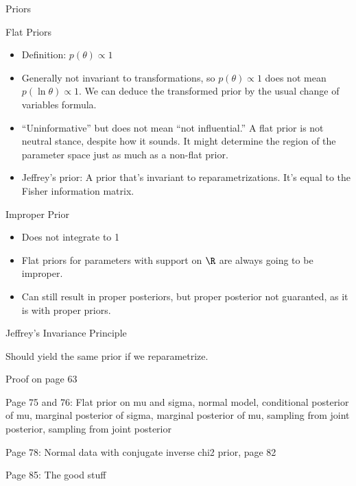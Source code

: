 \documentclass[aspectratio=169, handout]{beamer}
\begin{document}
{\scriptsize
\begin{frame}{Priors}

Flat Priors
\begin{itemize}
  \item Definition: $p(\theta)\propto 1$
  \item Generally not invariant to transformations, so
    $p(\theta)\propto 1$ does not mean $p(\ln \theta)\propto 1$.
    We can deduce the transformed prior by the usual change of variables
    formula.
  \item
    ``Uninformative'' but does not mean ``not influential.''
    A flat prior is not neutral stance, despite how it sounds.
    It might determine the region of the parameter space just as much as
    a non-flat prior.

  \item
    \alert{Jeffrey's prior}:
    A prior that's invariant to reparametrizations.
    It's equal to the Fisher information matrix.
\end{itemize}
\alert{Improper Prior}
\begin{itemize}
  \item Does not integrate to 1
  \item Flat priors for parameters with support on $\R$ are always going
    to be improper.
  \item Can still result in proper posteriors, but proper posterior not
    guaranted, as it is with proper priors.
\end{itemize}
\end{frame}
}



{\footnotesize
\begin{frame}{Jeffrey's Invariance Principle}

Should yield the same prior if we reparametrize.

Proof on page 63

Page 75 and 76: Flat prior on mu and sigma, normal model, conditional
posterior of mu, marginal posterior of sigma, marginal posterior of mu,
sampling from joint posterior, sampling from joint posterior

Page 78: Normal data with conjugate inverse chi2 prior, page 82

Page 85: The good stuff
\end{frame}
}
\end{document}
